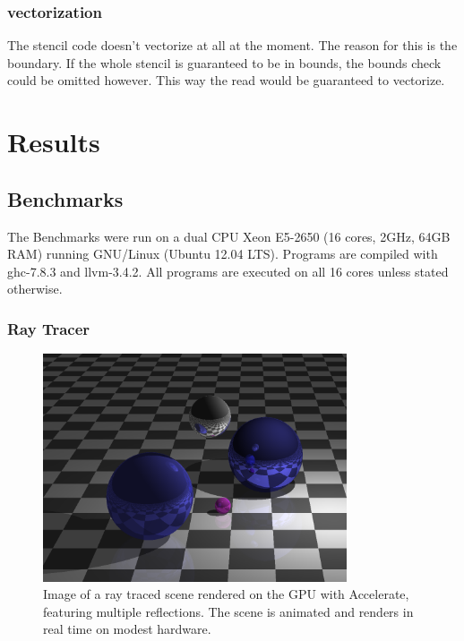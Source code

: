 \documentclass[a4paper,bibliography=totocnumbered,parskip,headsepline]{scrbook}
\begin{document}
\subsection{vectorization}
The stencil code doesn't vectorize at all at the moment.
The reason for this is the boundary.
If the whole stencil is guaranteed to be in bounds, the bounds check could be omitted however.
This way the read would be guaranteed to vectorize.

\chapter{Results}
\section{Benchmarks}

The Benchmarks were run on a dual CPU Xeon E5-2650 (16 cores, 2GHz, 64GB RAM) running GNU/Linux (Ubuntu 12.04 LTS).
Programs are compiled with ghc-7.8.3 and llvm-3.4.2.
All programs are executed on all 16 cores unless stated otherwise.

\subsection{Ray Tracer}
\begin{figure}
    \centering
    \includegraphics[width=0.8\textwidth]{images/benchmarks/ray/ray_sample}
    \caption[Ray tracer]{Image of a ray traced scene rendered on the GPU with
    Accelerate, featuring multiple reflections. The scene is animated and
    renders in real time on modest hardware.}
    \label{fig:ray_sample}
\end{figure}
\end{document}
